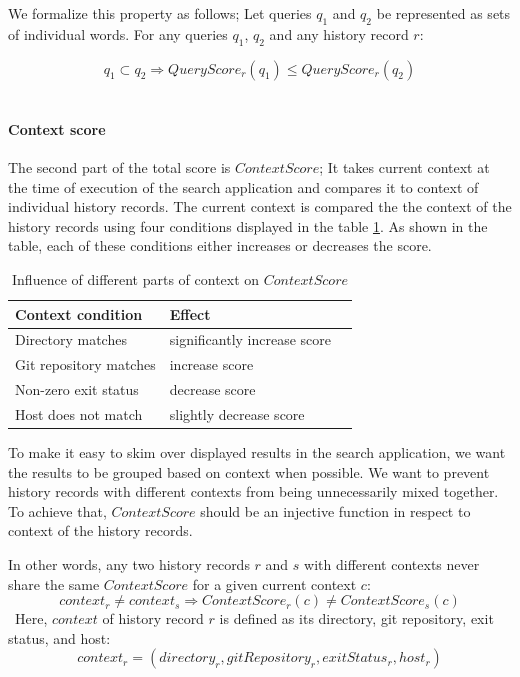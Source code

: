 We formalize this property as follows; Let queries \(q_1\) and \(q_2\) be represented as sets of individual words. For any queries \(q_1\), \(q_2\) and any history record \(r\):  

\[ q_1 \subset q_2 \Rightarrow QueryScore_r(q_1) \leq QueryScore_r(q_2)\]\

\paragraph{Context score}
The second part of the total score is \(ContextScore\); It takes current context at the time of execution of the search application and compares it to context of individual history records. 
The current context is compared the the context of the history records using four conditions displayed in the table \ref{tab:score-matching-context}. As shown in the table, each of these conditions either increases or decreases the score.

\begin{table}[h]
\centering
\begin{tabular}{lll}
\hline \hline
Context condition       & Effect \\
\hline
Directory matches      & significantly increase score \\ 
Git repository matches & increase score \\ 
Non-zero exit status   & decrease score \\
Host does not match    & slightly decrease score \\ 
\hline \hline
\end{tabular}
\caption{Influence of different parts of context on \(ContextScore\)}
\label{tab:score-matching-context}
\end{table}

To make it easy to skim over displayed results in the search application, we want the results to be grouped based on context when possible. 
We want to prevent history records with different contexts from being unnecessarily mixed together. 
To achieve that, \(ContextScore\) should be an injective function in respect to context of the history records.

In other words, any two history records \(r\) and \(s\) with different contexts never share the same \(ContextScore\) for a given current context \(c\):
\[ context_{r} \neq context_{s}  \Rightarrow ContextScore_r(c) \neq ContextScore_s(c) \]\
Here, \(context\) of history record \(r\) is defined as its directory, git repository, exit status, and host:
\[ context_r = (directory_r, gitRepository_r, exitStatus_r, host_r) \]



